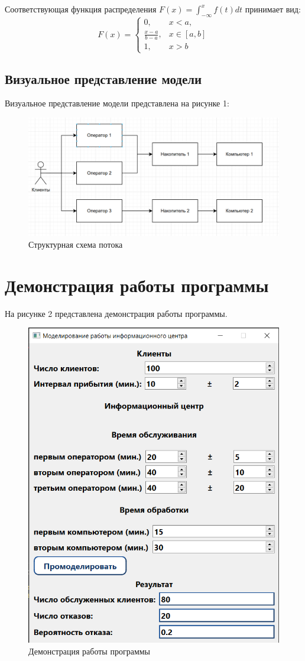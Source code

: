 Соответствующая функция распределения $F(x) = \int_{-\infty}^{x}f(t)dt$ принимает вид: 
\begin{equation}
	F(x)=\begin{cases}
		0, & x < a, \\
		\frac{x - a}{b - a}, & x \in [a, b] \\
		1, & x > b
	\end{cases}
\end{equation}

\subsection{Визуальное представление модели}
Визуальное представление модели представлена на рисунке 1:

\captionsetup{justification=centering}
\begin{figure}[h]
	\begin{center}
		\includegraphics[width=0.7\linewidth]{inc/flow.png}
	\end{center}
	\caption{Структурная схема потока}
\end{figure}

\section{Демонстрация работы программы}

На рисунке 2 представлена демонстрация работы программы.

\begin{figure}[h]
	\centering
	\includegraphics[width=0.7\linewidth]{inc/demo}
	\caption{Демонстрация работы программы}
	\label{fig:demo}
\end{figure}


